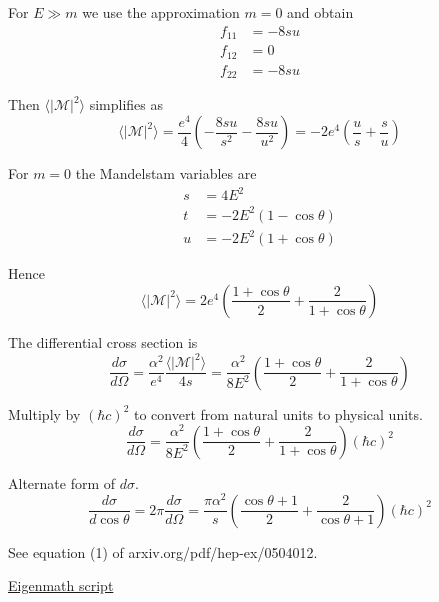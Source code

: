 For $E\gg m$ we use the approximation $m=0$ and obtain
\begin{align*}
f_{11}&=-8su
\\
f_{12}&=0
\\
f_{22}&=-8su
\end{align*}

Then $\langle|\mathcal{M}|^2\rangle$ simplifies as
\begin{equation*}
\langle|\mathcal{M}|^2\rangle=\frac{e^4}{4}
\left(-\frac{8su}{s^2}-\frac{8su}{u^2}\right)
=-2e^4\left(\frac{u}{s}+\frac{s}{u}\right)
\end{equation*}

For $m=0$ the Mandelstam variables are
\begin{align*}
s&=4E^2
\\
t&=-2E^2(1-\cos\theta)
\\
u&=-2E^2(1+\cos\theta)
\end{align*}

Hence
\begin{equation*}
\langle|\mathcal{M}|^2\rangle=2e^4
\left(\frac{1+\cos\theta}{2}+\frac{2}{1+\cos\theta}\right)
\end{equation*}

The differential cross section is
\begin{equation*}
\frac{d\sigma}{d\Omega}
=\frac{\alpha^2}{e^4}\frac{\langle|\mathcal{M}|^2\rangle}{4s}
=\frac{\alpha^2}{8E^2}\left(\frac{1+\cos\theta}{2}+\frac{2}{1+\cos\theta}\right)
\end{equation*}

Multiply by $(\hbar c)^2$ to convert from natural units to physical units.
\begin{equation*}
\frac{d\sigma}{d\Omega}
=\frac{\alpha^2}{8E^2}\left(\frac{1+\cos\theta}{2}+\frac{2}{1+\cos\theta}\right)(\hbar c)^2
\end{equation*}

Alternate form of $d\sigma$.
\begin{equation*}
\frac{d\sigma}{d\cos\theta}=2\pi\frac{d\sigma}{d\Omega}
=\frac{\pi\alpha^2}{s}
\left(\frac{\cos\theta+1}{2}+\frac{2}{\cos\theta+1}\right)(\hbar c)^2
\end{equation*}

See equation (1) of arxiv.org/pdf/hep-ex/0504012.

\bigskip
\href{https://georgeweigt.github.io/examples/compton-scattering-1-demo.html}{Eigenmath script}


